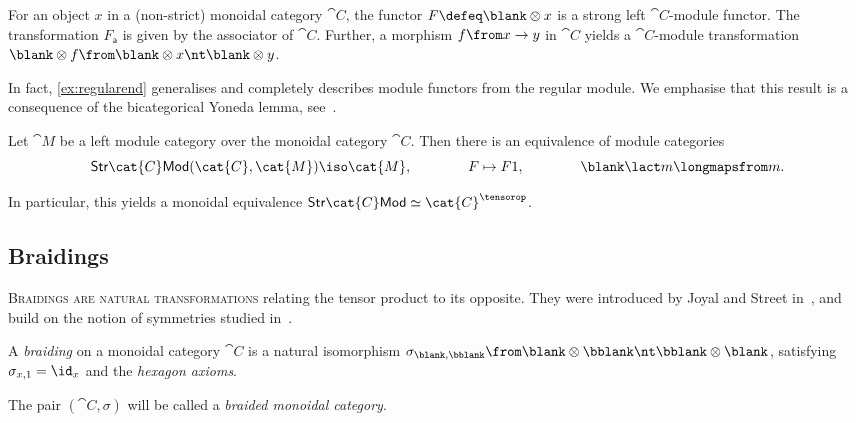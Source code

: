 \begin{example}\label{ex:regularend}
  For an object \(x\) in a (non-strict) monoidal category \(\cat{C}\),
  the functor \(F \defeq \blank \otimes x\) is a strong left \(\cat{C}\)\hyp{}module functor.
  The transformation \(F_{\mathsf{a}}\) is given by the associator of \(\cat{C}\).
  Further, a morphism \(f\from x \to y\) in \(\cat{C}\) yields a \(\cat{C}\)\hyp{}module transformation \(\blank \otimes f\from \blank \otimes x \nt \blank \otimes y\).
\end{example}

In fact, \cref{ex:regularend} generalises and completely describes module functors from the regular module.
We emphasise that this result is a consequence of the bicategorical Yoneda lemma,
see~\cite[Lemma~8.3.16]{johnson-yau2021:TwoDimensionalCategories}.

\begin{proposition}\label{prop:bicategorical-yoneda-correspondence-monads-and-algebras}
  Let \(\cat{M}\) be a left module category over the monoidal category \(\cat{C}\).
  Then there is an equivalence of module categories
  \[
    \mathsf{Str}\cat{C}\mathsf{Mod}(\cat{C}, \cat{M}) \iso \cat{M}, \qquad \qquad
    F \mapsto F1, \qquad \qquad
    \blank \lact m \longmapsfrom m.
  \]
\end{proposition}

In particular, this yields a monoidal equivalence \(\mathsf{Str}\cat{C}\mathsf{Mod} \simeq \cat{C}^{\tensorop}\).

\subsection{Braidings}\label{subsec: braided_and_ribbon_cats}

\textsc{Braidings are natural transformations} relating the tensor product to its opposite.
They were introduced by Joyal and Street in~\cite{joyal85:braided,joyal86:braided,Joyal1993},
and build on the notion of symmetries studied in~\cite{MacLane63naturalassociativity,Eilenberg1966}.

\begin{definition}\label{def: braided_cat}
  A \emph{braiding} on a monoidal category \(\cat{C}\) is a natural isomorphism
  \(\sigma_{\blank, \bblank} \from \blank \otimes \bblank \nt \bblank \otimes \blank\),
  satisfying \(\sigma_{x,1} = \id_x\) and the \emph{hexagon axioms}.

  The pair \((\cat{C}, \sigma)\) will be called a \emph{braided monoidal category}.
\end{definition}


